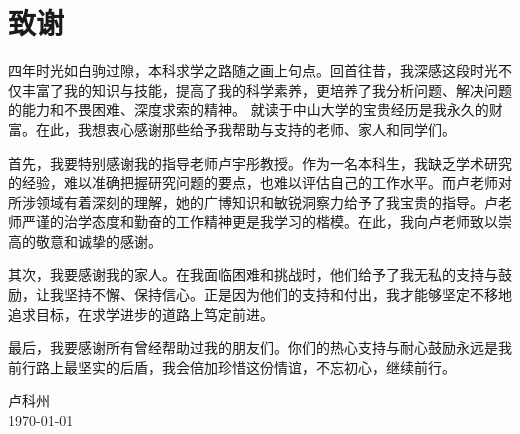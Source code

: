 
\chapter{致谢}

四年时光如白驹过隙，本科求学之路随之画上句点。回首往昔，我深感这段时光不仅丰富了我的知识与技能，提高了我的科学素养，更培养了我分析问题、解决问题的能力和不畏困难、深度求索的精神。
就读于中山大学的宝贵经历是我永久的财富。在此，我想衷心感谢那些给予我帮助与支持的老师、家人和同学们。

首先，我要特别感谢我的指导老师卢宇彤教授。作为一名本科生，我缺乏学术研究的经验，难以准确把握研究问题的要点，也难以评估自己的工作水平。而卢老师对所涉领域有着深刻的理解，她的广博知识和敏锐洞察力给予了我宝贵的指导。卢老师严谨的治学态度和勤奋的工作精神更是我学习的楷模。在此，我向卢老师致以崇高的敬意和诚挚的感谢。

其次，我要感谢我的家人。在我面临困难和挑战时，他们给予了我无私的支持与鼓励，让我坚持不懈、保持信心。正是因为他们的支持和付出，我才能够坚定不移地追求目标，在求学进步的道路上笃定前进。

最后，我要感谢所有曾经帮助过我的朋友们。你们的热心支持与耐心鼓励永远是我前行路上最坚实的后盾，我会倍加珍惜这份情谊，不忘初心，继续前行。

\vskip 108pt
\begin{flushright}
	卢科州\makebox[1cm]{} \\
	\today
\end{flushright}

